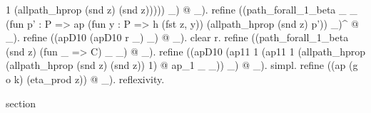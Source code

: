 \begin{coqdoccode}
\begin{coqdoccomment}
1\coqdocindent{0.50em}
(allpath\_hprop\coqdocindent{0.50em}
(snd\coqdocindent{0.50em}
z)\coqdocindent{0.50em}
(snd\coqdocindent{0.50em}
z)))))\coqdoceol
\coqdocindent{5.50em}
\_)\coqdocindent{0.50em}
@\coqdocindent{0.50em}
\_).\coqdoceol
\coqdocindent{1.00em}
refine\coqdocindent{0.50em}
((path\_forall\_1\_beta\coqdocindent{0.50em}
\_\coqdocindent{0.50em}
\_\coqdoceol
\coqdocindent{6.00em}
(fun\coqdocindent{0.50em}
p'\coqdocindent{0.50em}
:\coqdocindent{0.50em}
P\coqdocindent{0.50em}
=>\coqdoceol
\coqdocindent{6.50em}
ap\coqdocindent{0.50em}
(fun\coqdocindent{0.50em}
y\coqdocindent{0.50em}
:\coqdocindent{0.50em}
P\coqdocindent{0.50em}
=>\coqdocindent{0.50em}
h\coqdocindent{0.50em}
(fst\coqdocindent{0.50em}
z,\coqdocindent{0.50em}
y))\coqdocindent{0.50em}
(allpath\_hprop\coqdocindent{0.50em}
(snd\coqdocindent{0.50em}
z)\coqdocindent{0.50em}
p'))\coqdoceol
\coqdocindent{6.00em}
\_)\^{}\coqdocindent{0.50em}
@\coqdocindent{0.50em}
\_).\coqdoceol
\coqdocindent{1.00em}
refine\coqdocindent{0.50em}
((apD10\coqdocindent{0.50em}
(apD10\coqdocindent{0.50em}
r\coqdocindent{0.50em}
\_)\coqdocindent{0.50em}
\_)\coqdocindent{0.50em}
@\coqdocindent{0.50em}
\_).\coqdocindent{0.50em}
clear\coqdocindent{0.50em}
r.\coqdoceol
\coqdocindent{1.00em}
refine\coqdocindent{0.50em}
((path\_forall\_1\_beta\coqdocindent{0.50em}
(snd\coqdocindent{0.50em}
z)\coqdocindent{0.50em}
(fun\coqdocindent{0.50em}
\_\coqdocindent{0.50em}
=>\coqdocindent{0.50em}
C)\coqdocindent{0.50em}
\_\coqdocindent{0.50em}
\_)\coqdocindent{0.50em}
@\coqdocindent{0.50em}
\_).\coqdoceol
\coqdocindent{1.00em}
refine\coqdocindent{0.50em}
((apD10\coqdoceol
\coqdocindent{5.50em}
(ap11\coqdocindent{0.50em}
1\coqdoceol
\coqdocindent{7.00em}
(ap11\coqdocindent{0.50em}
1\coqdocindent{0.50em}
(allpath\_hprop\coqdocindent{0.50em}
(allpath\_hprop\coqdocindent{0.50em}
(snd\coqdocindent{0.50em}
z)\coqdocindent{0.50em}
(snd\coqdocindent{0.50em}
z))\coqdocindent{0.50em}
1)\coqdocindent{0.50em}
@\coqdoceol
\coqdocindent{7.50em}
ap\_1\coqdocindent{0.50em}
\_\coqdocindent{0.50em}
\_))\coqdoceol
\coqdocindent{5.50em}
\_)\coqdocindent{0.50em}
@\coqdocindent{0.50em}
\_).\coqdoceol
\coqdocindent{1.00em}
simpl.\coqdoceol
\coqdocindent{1.00em}
refine\coqdocindent{0.50em}
((ap\coqdocindent{0.50em}
(g\coqdocindent{0.50em}
o\coqdocindent{0.50em}
k)\coqdocindent{0.50em}
(eta\_prod\coqdocindent{0.50em}
z))\coqdocindent{0.50em}
@\coqdocindent{0.50em}
\_).\coqdoceol
\coqdocindent{1.00em}
reflexivity.\coqdoceol
\coqdoceol
\coqdocindent{1.00em}
\begin{coqdoccomment}
\coqdocindent{0.50em}
section\coqdocindent{0.50em}

\end{coqdoccomment}
\end{coqdoccomment}
\end{coqdoccode}

